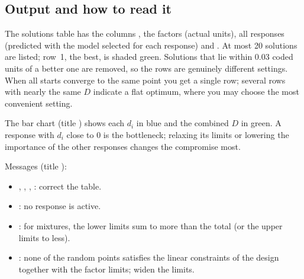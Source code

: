 \subsection{Output and how to read it}
The solutions table has the columns , the factors (actual units), all responses (predicted with the model
selected for each response) and . At most 20 solutions are listed; row~1, the best, is shaded
green. Solutions that lie within 0.03 coded units of a better one are removed, so the rows are genuinely different
settings. When all starts converge to the same point you get a single row; several rows with nearly the same $D$
indicate a flat optimum, where you may choose the most convenient setting.

The bar chart (title ) shows each $d_i$ in blue and the combined $D$ in green.
A response with $d_i$ close to 0 is the bottleneck; relaxing its limits or lowering the importance of the other
responses changes the compromise most.

Messages (title ):
\begin{itemize}
  \item {}, , , : correct the table.
  \item {}: no response is active.
  \item {}: for mixtures, the lower limits sum
        to more than the total (or the upper limits to less).
  \item {}: none of the random points satisfies the linear
        constraints of the design together with the factor limits; widen the limits.
\end{itemize}

